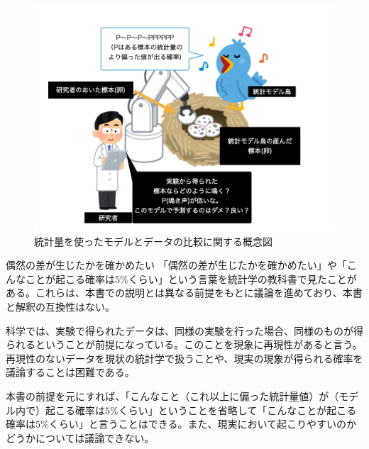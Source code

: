 \begin{figure}
    \begin{center}
        \includegraphics[bb=0 0 1024 768,width=15cm]{./image/01_/conceptual_diagram/conceptual_diagram.003.png}
        \caption{統計量を使ったモデルとデータの比較に関する概念図}
        \label{fig:conceptual_diagram_test}
    \end{center}
\end{figure}


\begin{SMbox}{偶然の差が生じたかを確かめたい}
    「偶然の差が生じたかを確かめたい」や「こんなことが起こる確率は$5\%$くらい」という言葉を統計学の教科書で見たことがある。これらは、本書での説明とは異なる前提をもとに議論を進めており、本書と解釈の互換性はない。

    科学では、実験で得られたデータは、同様の実験を行った場合、同様のものが得られるということが前提になっている。このことを現象に再現性があると言う。
    再現性のないデータを現状の統計学で扱うことや、現実の現象が得られる確率を議論することは困難である。

    本書の前提を元にすれば、「こんなこと（これ以上に偏った統計量値）が（モデル内で）起こる確率は$5\%$くらい」ということを省略して「こんなことが起こる確率は$5\%$くらい」と言うことはできる。また、現実において起こりやすいのかどうかについては議論できない。
\end{SMbox}


